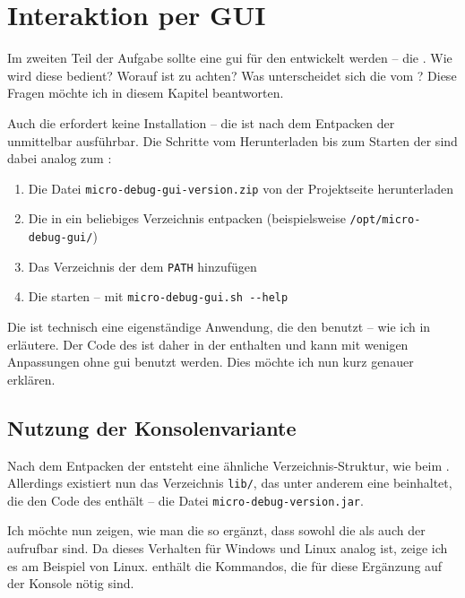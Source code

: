 \chapter{Interaktion per GUI}
Im zweiten Teil der Aufgabe sollte eine \gls{gui} für den \md entwickelt werden -- die \mdg. Wie wird diese bedient? Worauf ist zu achten? Was unterscheidet sich die \mdg vom \md? Diese Fragen möchte ich in diesem Kapitel beantworten.%

Auch die \mdg erfordert keine Installation -- die \mdg ist nach dem Entpacken der  unmittelbar ausführbar. Die Schritte vom Herunterladen bis zum Starten der \mdg sind dabei analog zum \md:

\begin{enumerate}
\item Die Datei \texttt{micro-debug-gui-version.zip} von der Projektseite \cite{Roesch2012gui} herunterladen
\item Die  in ein beliebiges Verzeichnis entpacken (beispielsweise \texttt{/opt/micro-debug-gui/})
\item Das Verzeichnis der \mdg dem \texttt{PATH} hinzufügen
\item Die \mdg starten -- mit \texttt{micro-debug-gui.sh~-{}-help}
\end{enumerate}

Die \mdg ist technisch eine eigenständige Anwendung, die den \md benutzt -- wie ich in  erläutere. Der Code des \md ist daher in der \mdg enthalten und kann mit wenigen Anpassungen ohne \gls{gui} benutzt werden. Dies möchte ich nun kurz genauer erklären.

\section{Nutzung der Konsolenvariante}
Nach dem Entpacken der  entsteht eine ähnliche Verzeichnis-Struktur, wie beim \md. Allerdings existiert nun das Verzeichnis \texttt{lib/}, das unter anderem eine  beinhaltet, die den Code des \md enthält -- die Datei \texttt{micro-debug-version.jar}.

Ich möchte nun zeigen, wie man die \mdg so ergänzt, dass sowohl die \mdg als auch der \md aufrufbar sind. Da dieses Verhalten für Windows und Linux analog ist, zeige ich es am Beispiel von Linux.  enthält die Kommandos, die für diese Ergänzung auf der Konsole nötig sind.

